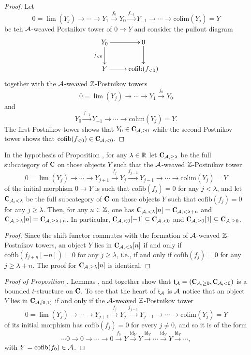 \begin{proof}
Let
\[
0 =\lim(Y_j)\to\cdots \to Y_{1} \xrightarrow{f_{0}} Y_{0} \xrightarrow{f_{-1}}Y_{-1}\to \cdots\to \mathrm{colim}(Y_j)=Y
\]
be teh $\mathcal{A}$-weaved Postnikov tower of $0\to Y$ and consider the pullout diagram
\[
\xymatrix{
Y_0\ar[r]\ar[d]_{f_{<0}}&0\ar[d]\\
Y\ar[r]&\mathrm{cofib}(f_{<0})
}\]
together with the $\mathcal{A}$-weaved $\mathbb{Z}$-Postnikov towers
\[
0 =\lim(Y_j)\to\cdots \to Y_{1} \xrightarrow{f_{0}} Y_{0} 
\]
and
\[
Y_{0}\xrightarrow{f_{-1}}Y_{-1}\to \cdots\to \mathrm{colim}(Y_j)=Y.
\]
The first Postnikov tower shows that $Y_0\in \C_{\A,\geq 0}$ while the second Postnikov tower shows that $\mathrm{cofib}(f_{<0})\in  \C_{\A,<0}$.
\end{proof}
\begin{lemma}\label{tre}
In the hypothesis of Proposition , for any $\lambda\in \mathbb{R}$ let
$\C_{\A,\geq \lambda}$ be the full subcategory of $\C$ on those objects $Y$ such that  the $\mathcal{A}$-weaved $\mathbb{Z}$-Postnikov tower
\[
0 =\lim(Y_j)\to\cdots \to Y_{j+1} \xrightarrow{f_{j}} Y_{j} \xrightarrow{f_{j-1}}Y_{j-1}\to \cdots\to \mathrm{colim}(Y_j)=Y
\]
of the initial morphism $0\to Y$ is such that $\mathrm{cofib}(f_j)=0$ for any $j<\lambda$, and let $\C_{\A,< \lambda}$ be the full subcategory of $\C$ on those objects $Y$ such that $\mathrm{cofib}(f_j)=0$ for any $j\geq \lambda$. 
Then, for any $n\in\mathbb{Z}$, one has $\C_{\A,< \lambda}[n]=\C_{\A,< \lambda+n}$ and $\C_{\A,\geq \lambda}[n]=\C_{\A,\geq \lambda+n}$. In particular, $\C_{\A,<0}[-1]\subseteq \C_{\A,<0}$ and $\C_{\A,\geq 0}[1]\subseteq\C_{\A,\geq 0}$.
\end{lemma}
\begin{proof}
Since the shift functor commutes with the formation of  $\mathcal{A}$-weaved $\mathbb{Z}$-Postnikov towers, an object $Y$ lies in $\C_{\A,< \lambda}[n]$ if and only if $\mathrm{cofib}(f_{j+n}[-n])=0$ for any $j\geq \lambda$, i.e.,  if and only if $\mathrm{cofib}(f_j)=0$ for any $j\geq \lambda+n$.
The proof for $\C_{\A,\geq \lambda}[n]$ is identical.
\end{proof}
\begin{proof}[Proof of Proposition ]
Lemmas ,  and  together show that $\mathfrak{t}_\A=(\C_{\A,\geq 0}, \C_{\A,<0})$ is a bounded $t$-structure on $\C$. To see that the heart of  $\mathfrak{t}_{\mathcal{A}}$ is $\mathcal{A}$ notice that an object $Y$ lies in $\C_{\A,[0,1)}$ if and only if the $\mathcal{A}$-weaved $\mathbb{Z}$-Postnikov tower
\[
0 =\lim(Y_j)\to\cdots \to Y_{j+1} \xrightarrow{f_{j}} Y_{j} \xrightarrow{f_{j-1}}Y_{j-1}\to \cdots\to \mathrm{colim}(Y_j)=Y
\]
of its initial morphism has $\mathrm{cofib}(f_j)=0$ for every $j\neq0$, and so it is of the form
\[
\cdots 0 \to 0\to \cdots \to 0\xrightarrow{f_{0}} Y \xrightarrow{\mathrm{id}_Y}Y\xrightarrow{\mathrm{id}_Y} \cdots\xrightarrow{\mathrm{id}_Y}Y\xrightarrow{\mathrm{id}_Y}\cdots,\] 
with $Y=\mathrm{cofib}(f_0)\in \mathcal{A}$.
\end{proof}
